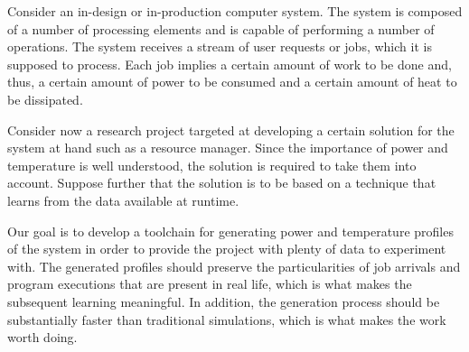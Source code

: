 Consider an in-design or in-production computer system. The system is composed
of a number of processing elements and is capable of performing a number of
operations. The system receives a stream of user requests or jobs, which it is
supposed to process. Each job implies a certain amount of work to be done and,
thus, a certain amount of power to be consumed and a certain amount of heat to
be dissipated.

Consider now a research project targeted at developing a certain solution for
the system at hand such as a resource manager. Since the importance of power and
temperature is well understood, the solution is required to take them into
account. Suppose further that the solution is to be based on a technique that
learns from the data available at runtime.

Our goal is to develop a toolchain for generating power and temperature profiles
of the system in order to provide the project with plenty of data to experiment
with. The generated profiles should preserve the particularities of job arrivals
and program executions that are present in real life, which is what makes the
subsequent learning meaningful. In addition, the generation process should be
substantially faster than traditional simulations, which is what makes the work
worth doing.
